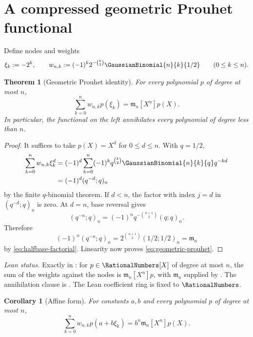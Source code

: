 \documentclass[11pt,a4paper,oneside,openany]{book}
\newtheorem{theorem}{Theorem}[chapter]
\newtheorem{corollary}[corollary]{Corollary}
\theoremstyle{definition}
\theoremstyle{remark}
\begin{document}
\section{A compressed geometric Prouhet functional}

Define nodes and weights
\begin{equation}\label{eq:halfbase-prouhet-data}
 \xi_k:=-2^k,
 \qquad
 w_{n,k}:=(-1)^k2^{-\binom k2}\GaussianBinomial{n}{k}{1/2}
 \qquad(0\le k\le n).
\end{equation}

\begin{theorem}[Geometric Prouhet identity]\label{thm:geometric-prouhet}
For every polynomial $p$ of degree at most $n$,
\begin{equation}\label{eq:geometric-prouhet}
 \sum_{k=0}^{n}w_{n,k}p(\xi_k)
 =\mathfrak m_n[X^n]p(X).
\end{equation}
In particular, the functional on the left annihilates every polynomial of degree less than $n$.
\end{theorem}

\begin{proof}
It suffices to take $p(X)=X^d$ for $0\le d\le n$.  With $q=1/2$,
\begin{align*}
 \sum_{k=0}^{n}w_{n,k}\xi_k^d
 &=(-1)^d\sum_{k=0}^{n}(-1)^kq^{\binom k2}
   \GaussianBinomial{n}{k}{q} q^{-kd}\\
 &=(-1)^d(q^{-d};q)_n
\end{align*}
by the finite $q$-binomial theorem.  If $d<n$, the factor with index $j=d$ in
$(q^{-d};q)_n$ is zero.  At $d=n$, base reversal gives
\[
 (q^{-n};q)_n=(-1)^nq^{-\binom{n+1}{2}}(q;q)_n.
\]
Therefore
\[
 (-1)^n(q^{-n};q)_n
 =2^{\binom{n+1}{2}}(1/2;1/2)_n
 =\mathfrak m_n
\]
by \eqref{eq:halfbase-factorial}.  Linearity now proves \eqref{eq:geometric-prouhet}.
\end{proof}
\emph{Lean status.}  Exactly  in
: for \(p\in\RationalNumbers[X]\) of degree at most \(n\), the sum of the weights
 against the nodes  is
\(\mathfrak m_n[X^n]p\), with \(\mathfrak m_n\) supplied by .  The
annihilation clause is .
The Lean coefficient ring is fixed to \(\RationalNumbers\).


\begin{corollary}[Affine form]\label{cor:geometric-prouhet-affine}
For constants $a,b$ and every polynomial $p$ of degree at most $n$,
\[
 \sum_{k=0}^{n}w_{n,k}p(a+b\xi_k)
 =b^n\mathfrak m_n[X^n]p(X).
\]
\end{corollary}
\end{document}
